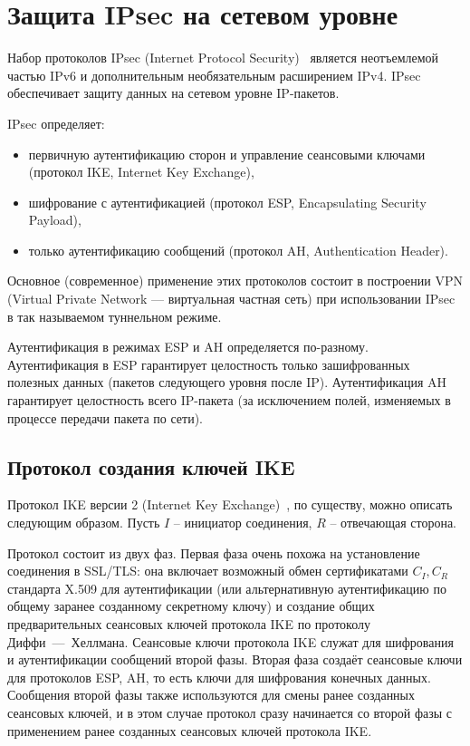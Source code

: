 \section{Защита IPsec на сетевом уровне}

Набор протоколов IPsec (Internet Protocol Security)~\cite{rfc4301} является неотъемлемой частью IPv6 и дополнительным необязательным расширением IPv4. IPsec обеспечивает защиту данных на сетевом уровне IP-пакетов.

IPsec определяет:
\begin{itemize}
    \item первичную аутентификацию сторон и управление сеансовыми ключами (протокол IKE, Internet Key Exchange),
    \item шифрование с аутентификацией (протокол ESP, Encapsulating Security Payload),
    \item только аутентификацию сообщений (протокол AH, Authentication Header).
\end{itemize}
Основное (современное) применение этих протоколов состоит в построении VPN (Virtual Private Network --- виртуальная частная сеть) при использовании IPsec в так называемом туннельном режиме.

Аутентификация в режимах ESP и AH определяется по-разному. Аутентификация в ESP гарантирует целостность только зашифрованных полезных данных (пакетов следующего уровня после IP). Аутентификация AH гарантирует целостность всего IP-пакета (за исключением полей, изменяемых в процессе передачи пакета по сети).

\subsection{Протокол создания ключей IKE}


Протокол IKE версии 2 (Internet Key Exchange)~\cite{rfc4306}, по существу, можно описать следующим образом. Пусть $I$ -- инициатор соединения, $R$ -- отвечающая сторона.

Протокол состоит из двух фаз. Первая фаза очень похожа на установление соединения в SSL/TLS: она включает возможный обмен сертификатами $C_I, C_R$ стандарта X.509 для аутентификации (или альтернативную аутентификацию по общему заранее созданному секретному ключу) и создание общих предварительных сеансовых ключей протокола IKE по протоколу Диффи~---~Хеллмана. Сеансовые ключи протокола IKE служат для шифрования и аутентификации сообщений второй фазы. Вторая фаза создаёт сеансовые ключи для протоколов ESP, AH, то есть ключи для шифрования конечных данных. Сообщения второй фазы также используются для смены ранее созданных сеансовых ключей, и в этом случае протокол сразу начинается со второй фазы с применением ранее созданных сеансовых ключей протокола IKE.

